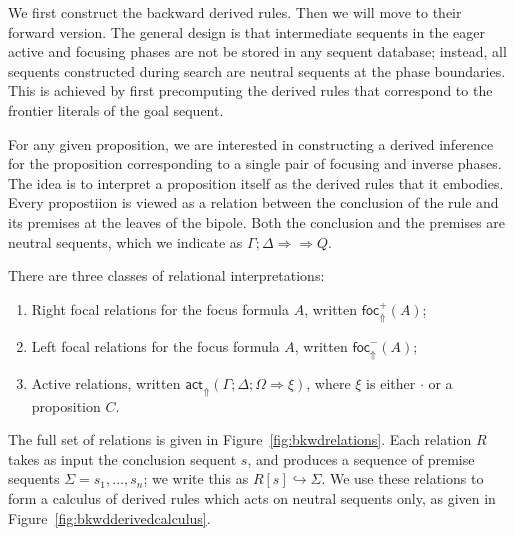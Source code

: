 \documentclass{article}
\theoremstyle{definition}
\newcommand{\bneuseqsymb}{
  \mathrel{\Longrightarrow\!\!\!\!\!\!\!\!\Longrightarrow}}
\newcommand{\bneuseq}[3]{#1 ; #2 \bneuseqsymb #3}
\newcommand{\brfrel}[1]{\textsf{foc}^+_{\Uparrow}(#1)}
\newcommand{\blfrel}[1]{\textsf{foc}^-_{\Uparrow}(#1)}
\newcommand{\bactrel}[1]{\textsf{act}_{\Uparrow}(#1)}
\newcommand{\relj}[3]{#1 [#2] \hookrightarrow #3}
\newcommand{\btriseq}[4]{#1; #2; #3 \Longrightarrow #4}
\begin{document}
We first construct the backward derived rules. Then we will move to their
forward version. The general design is that intermediate sequents in the eager
active and focusing phases are not be stored in any sequent database; instead,
all sequents constructed during search are neutral sequents at the phase
boundaries. This is achieved by first precomputing the derived rules that
correspond to the frontier literals of the goal sequent.

For any given proposition, we are interested in constructing a derived inference
for the proposition corresponding to a single pair of focusing and inverse
phases. The idea is to interpret a proposition itself as the derived rules that
it embodies. Every propostiion is viewed as a relation between the conclusion of
the rule and its premises at the leaves of the bipole. Both the conclusion and
the premises are neutral sequents, which we indicate as
$\bneuseq{\Gamma}{\Delta}{Q}$.

There are three classes of relational interpretations:

\begin{enumerate}
\item Right focal relations for the focus formula $A$, written $\brfrel{A}$;
\item Left focal relations for the focus formula $A$, written $\blfrel{A}$;
\item Active relations, written
  $\bactrel{\btriseq{\Gamma}{\Delta}{\Omega}{\xi}}$, where $\xi$ is either
  $\cdot$ or a proposition $C$.
\end{enumerate}

The full set of relations is given in Figure~\ref{fig:bkwdrelations}. Each
relation $R$ takes as input the conclusion sequent $s$, and produces a sequence
of premise sequents $\Sigma = s_1, \dots, s_n$; we write this as
$\relj{R}{s}{\Sigma}$. We use these relations to form a calculus of derived
rules which acts on neutral sequents only, as given in
Figure~\ref{fig:bkwdderivedcalculus}.
\end{document}
